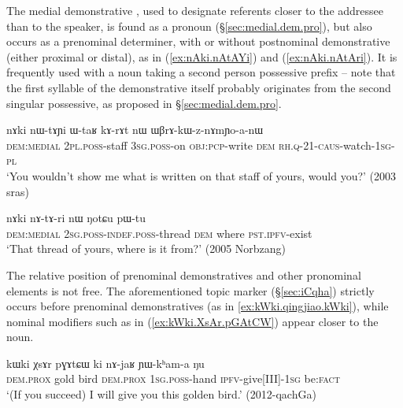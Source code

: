 The medial demonstrative , used to designate referents closer to the addressee than to the speaker, is found as a pronoun (§\ref{sec:medial.dem.pro}), but also occurs as a prenominal determiner, with or without postnominal demonstrative (either proximal or distal), as in (\ref{ex:nAki.nAtAYi}) and (\ref{ex:nAki.nAtAri}). It is frequently used with a noun taking a second person possessive prefix -- note that the first syllable  of the demonstrative  itself probably originates from the second singular possessive, as proposed in §\ref{sec:medial.dem.pro}.

\begin{exe}
\ex \label{ex:nAki.nAtAYi}
 \gll nɤki nɯ-tɤɲi ɯ-taʁ kɤ-rɤt nɯ ɯβrɤ-kɯ-z-nɤmɲo-a-nɯ \\
 \textsc{dem}:\textsc{medial} \textsc{2pl}.\textsc{poss}-staff \textsc{3sg}.\textsc{poss}-on \textsc{obj}:\textsc{pcp}-write \textsc{dem} \textsc{rh}.\textsc{q}-2\fl{}1-\textsc{caus}-watch-\textsc{1sg}-\textsc{pl} \\
 \glt `You wouldn't show me what is written on that staff of yours, would you?' (2003 sras)
\end{exe}

\begin{exe}
\ex \label{ex:nAki.nAtAri}
 \gll nɤki nɤ-tɤ-ri nɯ ŋotɕu pɯ-tu \\
 \textsc{dem}:\textsc{medial} \textsc{2sg}.\textsc{poss}-\textsc{indef}.\textsc{poss}-thread \textsc{dem} where \textsc{pst}.\textsc{ipfv}-exist \\
\glt `That thread of yours, where is it from?' (2005 Norbzang)
\end{exe}

The relative position of prenominal demonstratives and other pronominal elements is not free. The aforementioned topic marker  (§\ref{sec:iCqha}) strictly occurs before prenominal demonstratives (as in \ref{ex:kWki.qingjiao.kWki}), while nominal modifiers such as  in (\ref{ex:kWki.XsAr.pGAtCW}) appear closer to the noun. 

\begin{exe}
\ex \label{ex:kWki.XsAr.pGAtCW}
 \gll kɯki χsɤr pɣɤtɕɯ ki nɤ-jaʁ ɲɯ-kʰam-a ŋu \\
\textsc{dem}.\textsc{prox} gold bird \textsc{dem}.\textsc{prox} \textsc{1sg}.\textsc{poss}-hand \textsc{ipfv}-give[III]-\textsc{1sg} be:\textsc{fact} \\
\glt `(If you succeed) I will give you this golden bird.' (2012-qachGa)
\end{exe}

